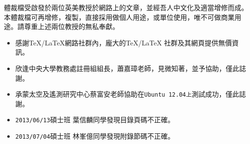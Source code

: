 \begin{acknowledgements} 

體裁檔受啟發於兩位英美教授於網路上的文章，並經吾人中文化及適當增修而成。本體裁檔可再增修，複製，直接採用做個人用途，或單位使用，唯不可做商業用途。請尊重上述兩位教授的無私奉獻。

\begin{itemize}
\item 感謝\TeX{}/\LaTeX{}網路社群內，龐大的\TeX{}/\LaTeX{} 社群及其網頁提供無價資訊。
\item 欣逢中央大學教務處註冊組組長，蕭嘉璋老師，見微知著，並予協助，僅此誌謝。
\item 承蒙太空及遙測研究中心蔡富安老師協助在{\tt Ubuntu 12.04上}\hfil{}測試成功，僅此誌謝。
\item \texttt{2013/06/13}碩士班 葉信麟同學發現目錄頁碼不正確。
\item \texttt{2013/07/04}碩士班 林峯億同學發現附錄節碼不正確。
\end{itemize}
\end{acknowledgements} 